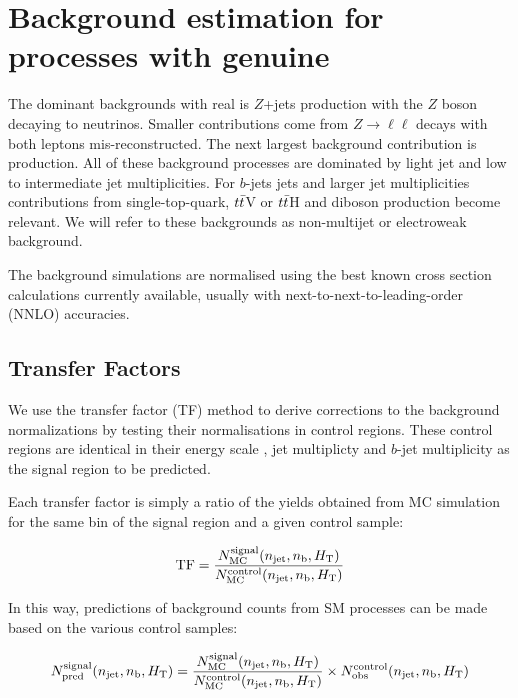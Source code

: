 
\section{Background estimation for processes with genuine \met}

The dominant backgrounds with real \met is $Z$+jets production with the $Z$ boson decaying to neutrinos.
Smaller contributions come from $Z\to \ell \ell$ decays with both leptons
mis-reconstructed. The next largest background contribution is \wtaunu production. All of these background processes are dominated
by light jet and low to intermediate jet multiplicities. For $b$-jets jets and larger jet 
multiplicities contributions from single-top-quark, $t\bar{t}$V or $t\bar{t}$H and diboson production become relevant. We will refer
to these backgrounds as non-multijet or electroweak background.

The background simulations are normalised using the best known cross
section calculations currently available, usually with next-to-next-to-leading-order (NNLO) accuracies. 

\subsection{Transfer Factors}
\label{sec:ewk-method}

We use the transfer factor (TF) method to derive corrections to the background normalizations by testing their normalisations
in control regions. These control regions are identical in their energy scale \scalht, jet multiplicty \njet and $b$-jet multiplicity \nb 
as the signal region to be predicted. 

Each transfer factor is simply a ratio of the yields obtained from MC
simulation for the same bin of the signal region and a given control
sample:

\begin{equation}
  \label{equ:tf-ratio}
  {\rm TF} = \frac{N_{\rm MC}^{\rm signal}(n_{\text{jet}},n_{\text{b}},\mbox{$H_\text{T}$})}{N_{\rm
      MC}^{\rm control}(n_{\text{jet}},n_{\text{b}},\mbox{$H_\text{T}$})} 
\end{equation}

In this way, predictions of background counts from SM processes can be
made based on the various control samples:

\begin{equation}
  \label{equ:pred-method}
  N_{\textrm{pred}}^{\rm signal}(n_{\text{jet}},n_{\text{b}},\mbox{$H_\text{T}$}) = \frac{N_{\rm MC}^{\rm
      signal}(n_{\text{jet}},n_{\text{b}},\mbox{$H_\text{T}$})}{N_{\rm MC}^{\rm
      control}(n_{\text{jet}},n_{\text{b}},\mbox{$H_\text{T}$})} \times N_{\textrm{obs}}^{\rm
    control}(n_{\text{jet}},n_{\text{b}},\mbox{$H_\text{T}$})   
\end{equation}


